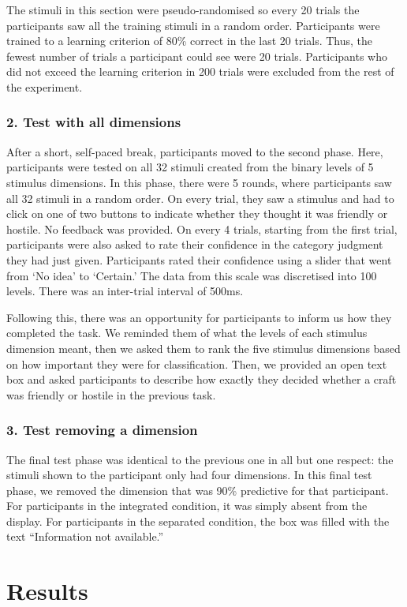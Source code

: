\documentclass[doc, a4paper, apacite]{apa6}
\begin{document}
The stimuli in this section were pseudo-randomised so every 20 trials the participants saw all the training stimuli in a random order. 
Participants were trained to a learning criterion of 80\% correct in the last 20 trials. 
Thus, the fewest number of trials a participant could see were 20 trials. 
Participants who did not exceed the learning criterion in 200 trials were excluded from the rest of the experiment. 

\subsubsection{2. Test with all dimensions}
After a short, self-paced break, participants moved to the second phase. 
Here, participants were tested on all 32 stimuli created from the binary levels of 5 stimulus dimensions. 
In this phase, there were 5 rounds, where participants saw all 32 stimuli in a random order. 
On every trial, they saw a stimulus and had to click on one of two buttons to indicate whether they thought it was friendly or hostile. 
No feedback was provided. 
On every 4 trials, starting from the first trial, participants were also asked to rate their confidence in the category judgment they had just given. 
Participants rated their confidence using a slider that went from `No idea' to `Certain.'
The data from this scale was discretised into 100 levels. 
There was an inter-trial interval of 500ms. 

Following this, there was an opportunity for participants to inform us how they completed the task. 
We reminded them of what the levels of each stimulus dimension meant, then we asked them to rank the five stimulus dimensions based on how important they were for classification. 
Then, we provided an open text box and asked participants to describe how exactly they decided whether a craft was friendly or hostile in the previous task.

\subsubsection{3. Test removing a dimension}
The final test phase was identical to the previous one in all but one respect: the stimuli shown to the participant only had four dimensions. 
In this final test phase, we removed the dimension that was 90\% predictive for that participant. 
For participants in the integrated condition, it was simply absent from the display. 
For participants in the separated condition, the box was filled with the text ``Information not available.''

\section{Results}

\clearpage
\newpage


\end{document}
